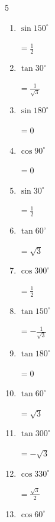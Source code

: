 \begin{multicols}{5}
\begin{enumerate}
        $\displaystyle なし$

  \item $\displaystyle \sin{150^\circ}$

        $\displaystyle =\frac{1}{2}$

  \item $\displaystyle \tan{30^\circ}$

        $\displaystyle =\frac{1}{\sqrt{3}}$

  \item $\displaystyle \sin{180^\circ}$

        $\displaystyle =0$

  \item $\displaystyle \cos{90^\circ}$

        $\displaystyle =0$

  \item $\displaystyle \sin{30^\circ}$

        $\displaystyle =\frac{1}{2}$

  \item $\displaystyle \tan{60^\circ}$

        $\displaystyle =\sqrt{3}$

  \item $\displaystyle \cos{300^\circ}$

        $\displaystyle =\frac{1}{2}$

  \item $\displaystyle \tan{150^\circ}$

        $\displaystyle =-\frac{1}{\sqrt{3}}$

  \item $\displaystyle \tan{180^\circ}$

        $\displaystyle =0$

  \item $\displaystyle \tan{60^\circ}$

        $\displaystyle =\sqrt{3}$

  \item $\displaystyle \tan{300^\circ}$

        $\displaystyle =-\sqrt{3}$

  \item $\displaystyle \cos{330^\circ}$

        $\displaystyle =\frac{\sqrt{3}}{2}$

\columnbreak %

  \item $\displaystyle \cos{60^\circ}$


\end{enumerate}
\end{multicols}
